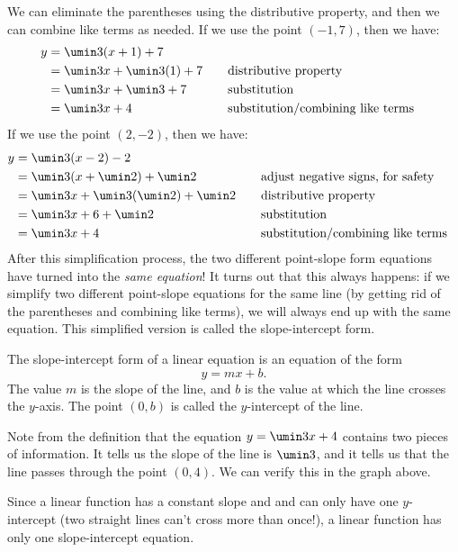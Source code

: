We can eliminate the parentheses using the distributive property, and then we can combine like terms as needed. If we use the point $(-1,7)$, then we have:
\[\begin{aligned}
y 	& = \umin3(x + 1) + 7\\
	& =\umin3x + \umin3(1) + 7
&& \text{\quad distributive property}\\
	& = \umin3x + \umin3 + 7
&& \text{\quad substitution}\\
	& = \umin3x + 4
&& \text{\quad substitution/combining like terms}
\end{aligned}
\]
If we use the point $(2,-2)$, then we have:
\[\begin{aligned}
y 	& = \umin3(x - 2) - 2\\
	& =\umin3(x + \umin2) + \umin2
&& \text{\quad adjust negative signs, for safety}\\
	& =\umin3x + \umin3(\umin2) + \umin2
&& \text{\quad distributive property}\\
	& = \umin3x + 6 + \umin2
&& \text{\quad substitution}\\
	& = \umin3x + 4
&& \text{\quad substitution/combining like terms}
\end{aligned}
\]
After this simplification process, the two different point-slope form equations have turned into the \textit{same equation}! It turns out that this always happens: if we simplify two different point-slope equations for the same line (by getting rid of the parentheses and combining like terms), we will always end up with the same equation. This simplified version is called the \gls{slope-intercept form}.

\begin{boxeddef}
The \gls{slope-intercept form} of a linear equation is an equation of the form \[y = mx +b.\] The value $m$ is the slope of the line, and $b$ is the value at which the line crosses the $y$-axis. The point $(0,b)$ is called the $y$-intercept of the line.
\end{boxeddef}

Note from the definition that the equation $y=\umin3x + 4$ contains two pieces of information. It tells us the slope of the line is $\umin3$, and it tells us that the line passes through the point $(0,4)$. We can verify this in the graph above.

Since a linear function has a constant slope and and can only have one $y$-intercept (two straight lines can't cross more than once!), a linear function has only one slope-intercept equation.

